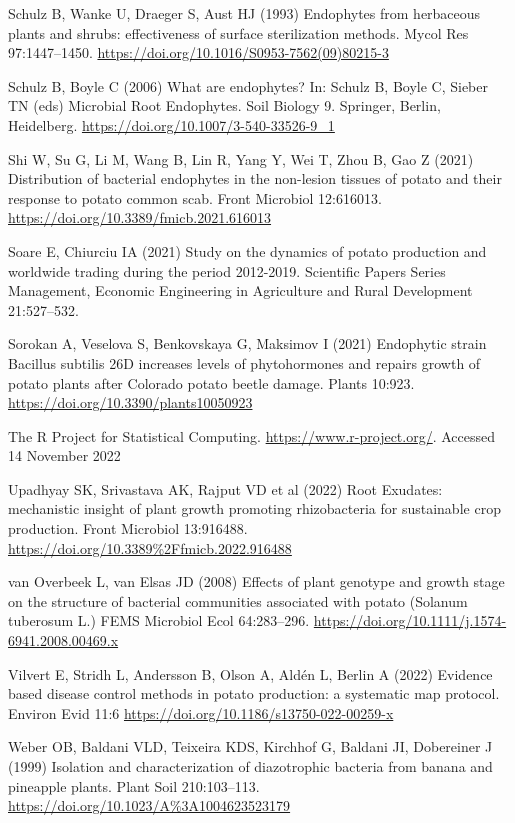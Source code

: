 \documentclass[sn-mathphys,Numbered]{sn-jnl}%
\theoremstyle{thmstyleone}%
\theoremstyle{thmstyletwo}%
\theoremstyle{thmstylethree}%
\begin{document}
Schulz B, Wanke U, Draeger S, Aust HJ (1993) Endophytes from herbaceous plants and shrubs: effectiveness of surface sterilization methods. Mycol Res 97:1447–1450. \url{https://doi.org/10.1016/S0953-7562(09)80215-3}

Schulz B, Boyle C (2006) What are endophytes? In: Schulz B, Boyle C, Sieber TN (eds) Microbial Root Endophytes. Soil Biology 9. Springer, Berlin, Heidelberg. \url{https://doi.org/10.1007/3-540-33526-9_1}

Shi W, Su G, Li M, Wang B, Lin R, Yang Y, Wei T, Zhou B, Gao Z (2021) Distribution of bacterial endophytes in the non-lesion tissues of potato and their response to potato common scab. Front Microbiol 12:616013. \url{https://doi.org/10.3389/fmicb.2021.616013}

Soare E, Chiurciu IA (2021) Study on the dynamics of potato production and worldwide trading during the period 2012-2019. Scientific Papers Series Management, Economic Engineering in Agriculture and Rural Development 21:527–532.

Sorokan A, Veselova S, Benkovskaya G, Maksimov I (2021) Endophytic strain Bacillus subtilis 26D increases levels of phytohormones and repairs growth of potato plants after Colorado potato beetle damage. Plants 10:923. \url{https://doi.org/10.3390/plants10050923}

The R Project for Statistical Computing. \url{https://www.r-project.org/}. Accessed 14 November 2022

Upadhyay SK, Srivastava AK, Rajput VD et al (2022) Root Exudates: mechanistic insight of plant growth promoting rhizobacteria for sustainable crop production. Front Microbiol 13:916488. \url{https://doi.org/10.3389%2Ffmicb.2022.916488}

van Overbeek L, van Elsas JD (2008) Effects of plant genotype and growth stage on the structure of bacterial communities associated with potato (Solanum tuberosum L.) FEMS Microbiol Ecol 64:283–296. \url{https://doi.org/10.1111/j.1574-6941.2008.00469.x}

Vilvert E, Stridh L, Andersson B, Olson A, Aldén L, Berlin A (2022) Evidence based disease control methods in potato production: a systematic map protocol. Environ Evid 11:6 \url{https://doi.org/10.1186/s13750-022-00259-x}

Weber OB, Baldani VLD, Teixeira KDS, Kirchhof G, Baldani JI, Dobereiner J (1999) Isolation and characterization of diazotrophic bacteria from banana and pineapple plants. Plant Soil 210:103–113. \url{https://doi.org/10.1023/A%3A1004623523179}
\end{document}
